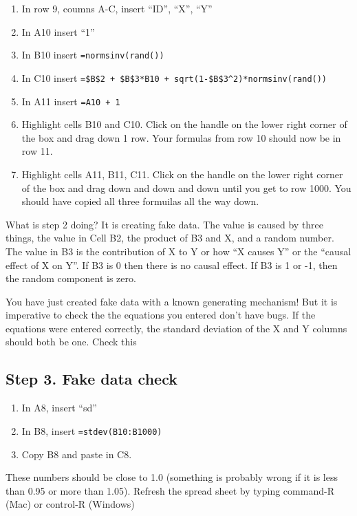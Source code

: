 \documentclass[]{book}
\providecommand{\tightlist}{%
  \setlength{\itemsep}{0pt}\setlength{\parskip}{0pt}}
\begin{document}
\begin{enumerate}
\def\labelenumi{\arabic{enumi}.}
\tightlist
\item
  In row 9, coumns A-C, insert ``ID'', ``X'', ``Y''
\item
  In A10 insert ``1''
\item
  In B10 insert \texttt{=normsinv(rand())}
\item
  In C10 insert
  \texttt{=\$B\$2\ +\ \$B\$3*B10\ +\ sqrt(1-\$B\$3\^{}2)*normsinv(rand())}
\item
  In A11 insert \texttt{=A10\ +\ 1}
\item
  Highlight cells B10 and C10. Click on the handle on the lower right
  corner of the box and drag down 1 row. Your formulas from row 10
  should now be in row 11.
\item
  Highlight cells A11, B11, C11. Click on the handle on the lower right
  corner of the box and drag down and down and down until you get to row
  1000. You should have copied all three formuilas all the way down.
\end{enumerate}

What is step 2 doing? It is creating fake data. The value is caused by
three things, the value in Cell B2, the product of B3 and X, and a
random number. The value in B3 is the contribution of X to Y or how ``X
causes Y'' or the ``causal effect of X on Y''. If B3 is 0 then there is
no causal effect. If B3 is 1 or -1, then the random component is zero.

You have just created fake data with a known generating mechanism! But
it is imperative to check the the equations you entered don't have bugs.
If the equations were entered correctly, the standard deviation of the X
and Y columns should both be one. Check this

\subsection{Step 3. Fake data check}\label{step-3.-fake-data-check}

\begin{enumerate}
\def\labelenumi{\arabic{enumi}.}
\tightlist
\item
  In A8, insert ``sd''
\item
  In B8, insert \texttt{=stdev(B10:B1000)}
\item
  Copy B8 and paste in C8.
\end{enumerate}

These numbers should be close to 1.0 (something is probably wrong if it
is less than 0.95 or more than 1.05). Refresh the spread sheet by typing
command-R (Mac) or control-R (Windows)
\end{document}
